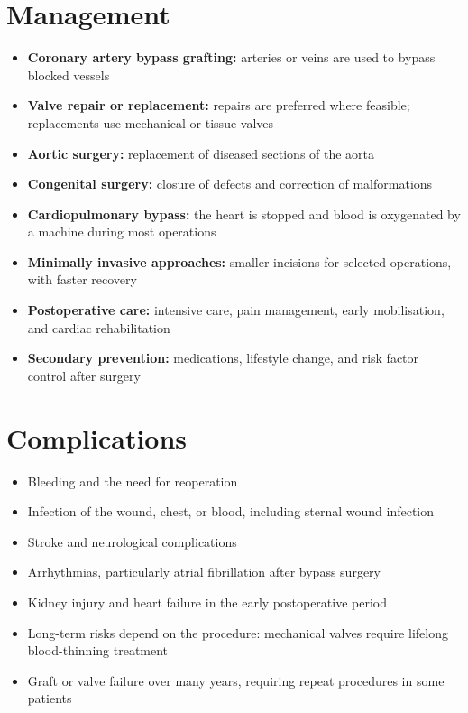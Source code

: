 \section*{Management}
\begin{itemize}
    \item \textbf{Coronary artery bypass grafting:} arteries or veins are used to bypass blocked vessels
    \item \textbf{Valve repair or replacement:} repairs are preferred where feasible; replacements use mechanical or tissue valves
    \item \textbf{Aortic surgery:} replacement of diseased sections of the aorta
    \item \textbf{Congenital surgery:} closure of defects and correction of malformations
    \item \textbf{Cardiopulmonary bypass:} the heart is stopped and blood is oxygenated by a machine during most operations
    \item \textbf{Minimally invasive approaches:} smaller incisions for selected operations, with faster recovery
    \item \textbf{Postoperative care:} intensive care, pain management, early mobilisation, and cardiac rehabilitation
    \item \textbf{Secondary prevention:} medications, lifestyle change, and risk factor control after surgery
\end{itemize}

\section*{Complications}
\begin{itemize}
    \item Bleeding and the need for reoperation
    \item Infection of the wound, chest, or blood, including sternal wound infection
    \item Stroke and neurological complications
    \item Arrhythmias, particularly atrial fibrillation after bypass surgery
    \item Kidney injury and heart failure in the early postoperative period
    \item Long-term risks depend on the procedure: mechanical valves require lifelong blood-thinning treatment
    \item Graft or valve failure over many years, requiring repeat procedures in some patients
\end{itemize}

